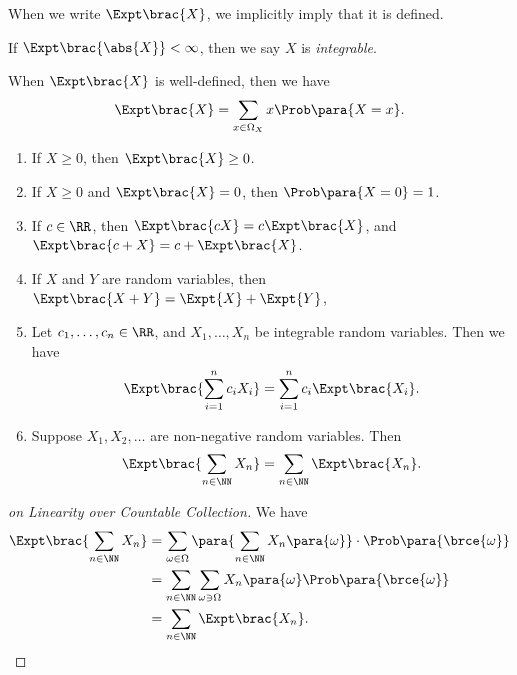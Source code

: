 When we write \(\Expt\brac{X}\), we implicitly imply that it is defined.

\begin{definition}
    \label{def:integrability-random-variable}%
    If \(\Expt\brac{\abs{X}} < \infty\), then we say \(X\) is \emph{integrable}.
\end{definition}

When \(\Expt\brac{X}\) is well-defined, then we have
\[
    \Expt\brac{X} = \sum_{x \in \Omega_X} x \Prob\para{X = x}.
\]

\begin{proposition}
    \label{prop:properties-expectation}%
    \begin{enumerate}
        \item If \(X \geq 0\), then \(\Expt\brac{X} \geq 0\).
        \item If \(X \geq 0\) and \(\Expt\brac{X} = 0 \), then \(\Prob\para{X = 0} = 1\).
        \item If \(c \in \RR\), then \(\Expt\brac{cX} = c \Expt\brac{X}\), and \(\Expt\brac{c + X} = c + \Expt\brac{X}\).
        \item If \(X\) and \(Y\) are random variables, then \(\Expt\brac{X + Y} = \Expt{X} + \Expt{Y}\),
        \item Let \(c_1, \ldots, c_n \in \RR\), and \(X_1, \ldots, X_n\) be integrable random variables. Then we have
        \[
            \Expt \brac{\sum_{i = 1}^{n} c_i X_i} = \sum_{i = 1}^{n} c_i \Expt \brac{X_i}.
        \]
        \item Suppose \(X_1, X_2, \ldots\) are non-negative random variables. Then
        \[
            \Expt\brac{\sum_{n \in \NN} X_n} = \sum_{n \in \NN} \Expt\brac{X_n}.
        \]
    \end{enumerate}
\end{proposition}

\begin{proof}[on Linearity over Countable Collection]
    We have
    \begin{align*}
        \Expt\brac{\sum_{n \in \NN} X_n} &= \sum_{\omega \in \Omega} \para{\sum_{n \in \NN} X_n \para{\omega}} \cdot \Prob\para{\brce{\omega}} \\
        &= \sum_{n \in \NN} \sum_{\omega \ni \Omega} X_n \para{\omega} \Prob\para{\brce{\omega}} \\
        &= \sum_{n \in \NN} \Expt\brac{X_n}.
    \end{align*}
\end{proof}

